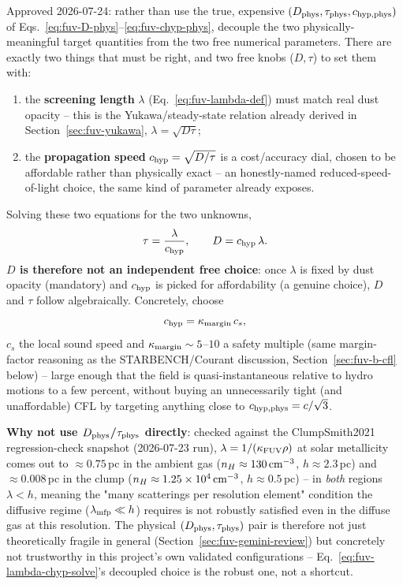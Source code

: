 Approved 2026-07-24: rather than use the true, expensive
$(D_{\rm phys},\tau_{\rm phys},c_{\rm hyp,phys})$ of
Eqs.~\ref{eq:fuv-D-phys}--\ref{eq:fuv-chyp-phys}, decouple the two
physically-meaningful target quantities from the two free numerical
parameters. There are exactly two things that must be right, and two
free knobs ($D,\tau$) to set them with:
\begin{enumerate}
  \item the \textbf{screening length} $\lambda$
    (Eq.~\ref{eq:fuv-lambda-def}) must match real dust opacity -- this
    is the Yukawa/steady-state relation already derived in
    Section~\ref{sec:fuv-yukawa}, $\lambda=\sqrt{D\tau}$;
  \item the \textbf{propagation speed} $c_{\rm hyp}=\sqrt{D/\tau}$ is a
    cost/accuracy dial, chosen to be affordable rather than physically
    exact -- an honestly-named reduced-speed-of-light choice, the same
    kind of parameter  already exposes.
\end{enumerate}
Solving these two equations for the two unknowns,
\begin{equation}
  \tau = \frac{\lambda}{c_{\rm hyp}} , \qquad
  D = c_{\rm hyp}\,\lambda .
  \label{eq:fuv-lambda-chyp-solve}
\end{equation}
\textbf{$D$ is therefore not an independent free choice}: once
$\lambda$ is fixed by dust opacity (mandatory) and $c_{\rm hyp}$ is
picked for affordability (a genuine choice), $D$ and $\tau$ follow
algebraically. Concretely, choose
\begin{equation}
  c_{\rm hyp} = \kappa_{\rm margin}\,c_s ,
  \label{eq:fuv-chyp-choice}
\end{equation}
$c_s$ the local sound speed and $\kappa_{\rm margin}\sim5$--$10$ a
safety multiple (same margin-factor reasoning as the STARBENCH/Courant
discussion, Section~\ref{sec:fuv-b-cfl} below) -- large enough that the
field is quasi-instantaneous relative to hydro motions to a few
percent, without buying an unnecessarily tight (and unaffordable) CFL
by targeting anything close to $c_{\rm hyp,phys}=c/\sqrt3$.

\textbf{Why not use $D_{\rm phys}$/$\tau_{\rm phys}$ directly}: checked
against the ClumpSmith2021 regression-check snapshot (2026-07-23 run),
$\lambda=1/(\kappa_{\rm FUV}\rho)$ at solar metallicity comes out to
$\approx0.75\,$pc in the ambient gas ($n_H\approx130\,{\rm cm^{-3}}$,
$h\approx2.3\,$pc) and $\approx0.008\,$pc in the clump
($n_H\approx1.25\times10^4\,{\rm cm^{-3}}$, $h\approx0.5\,$pc) -- in
\emph{both} regions $\lambda<h$, meaning the "many scatterings per
resolution element" condition the diffusive regime
($\lambda_{\rm mfp}\ll h$) requires is not robustly satisfied even in
the diffuse gas at this resolution. The physical
$(D_{\rm phys},\tau_{\rm phys})$ pair is therefore not just
theoretically fragile in general (Section~\ref{sec:fuv-gemini-review})
but concretely not trustworthy in this project's own validated
configurations -- Eq.~\ref{eq:fuv-lambda-chyp-solve}'s decoupled choice
is the robust one, not a shortcut.

